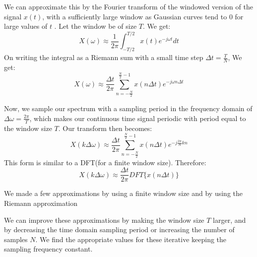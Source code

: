 \documentclass{article}
\begin{document}
We can approximate this by the Fourier transform of the windowed version
of the signal $x(t)$, with a sufficiently large window as Gaussian curves tend to $0$ for large values of $t$ . Let the window be of size $T$. We get:
\begin{equation}
  X(\omega) \approx \frac{1}{2 \pi} \int_{- T/2}^{T/2} x(t) e^{-j \omega t} dt  
\end{equation}
On writing the integral as a Riemann sum with a small time step $\Delta t = \frac{T}{N}$, We get:
\begin{equation}
    X(\omega) \approx \frac{\Delta t}{2 \pi} \sum_{n = -\frac{N}{2}}^{\frac{N}{2}-1} x(n \Delta t) e^{-j \omega n \Delta t}
\end{equation}

Now, we sample our spectrum with a sampling period in the frequency
domain of \(\Delta \omega = \frac{2 \pi}{T}\), which makes our
continuous time signal periodic with period equal to the window size
\(T\). Our transform then becomes:
\begin{equation}
X(k \Delta \omega) \approx \frac{\Delta t}{2 \pi} \sum_{n = -\frac{N}{2}}^{\frac{N}{2}-1}x(n \Delta t) e^{-j \frac{2 \pi}{N} k n} 
\end{equation}
This form is similar to a DFT(for a finite window size). Therefore:
\begin{equation}
X(k \Delta \omega) \approx \frac{\Delta t}{2 \pi} DFT \{x(n \Delta t)\}    
\end{equation}

We made a few approximations by using a finite window size and by using the Riemann approximation

We can improve these approximations by making the window size $T$ larger, and by decreasing the time domain sampling period or increasing the number of samples $N$. We find the appropriate values for these iterative keeping the sampling frequency constant.
\end{document}
